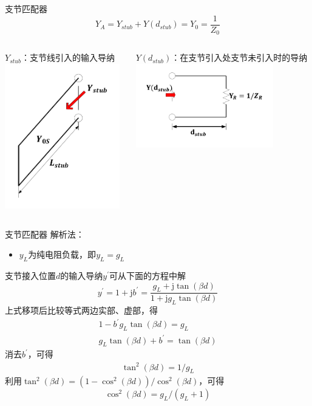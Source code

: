 \begin{frame}{支节匹配器}
  $$Y_A=Y_{stub}+Y(d_{stub})=Y_0=\frac{1}{Z_0}$$
  \begin{columns}
    \begin{column}{0.5\linewidth}
      $Y_{stub}$：支节线引入的输入导纳\\
      \includegraphics[width=5cm]{Cha4//fig4-25.pdf}
    \end{column}
    \begin{column}{0.5\linewidth}
      $Y(d_{stub})$：在支节引入处支节未引入时的导纳\\
      \includegraphics[width=6cm]{Cha4//fig4-26.pdf}
    \end{column}
  \end{columns}
\end{frame}

\begin{frame}{支节匹配器}
  解析法：
  \begin{itemize}
    \item $y_L$为纯电阻负载，即$y_L=g_L$
  \end{itemize}
  支节接入位置$d$的输入导纳$y^{'}$可从下面的方程中解
  $$y^{'}=1+\mathrm{j}b^{'}=\frac{g_L+\mathrm{j}\tan(\beta d)}{1+\mathrm{j}g_L\tan(\beta d)}$$
  上式移项后比较等式两边实部、虚部，得
  \begin{align}
    1-b^{'}g_L\tan(\beta d)=g_L \\
    g_L\tan(\beta d)+b^{'}=\tan(\beta d) \label{eqn4-1}
  \end{align}
  消去$b^{'}$，可得
  \begin{align}
    \tan^2(\beta d)=1/g_L \label{eqn4-2}
  \end{align}
  利用$\tan^2(\beta d)=(1-\cos^2(\beta d))/\cos^2(\beta d)$，可得
  $$\cos^2(\beta d)=g_L/(g_L+1)$$
\end{frame}

